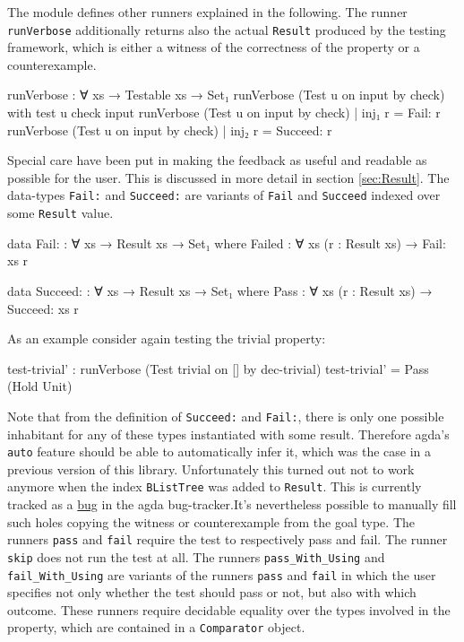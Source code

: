 \documentclass[10pt,a4paper]{article}
\begin{document}
The module defines other runners explained in the following.
The runner \texttt{runVerbose} additionally returns also the actual \texttt{Result} produced by the testing framework, which is either a witness of the correctness of the property or a counterexample.
\begin{code}
runVerbose : ∀ {xs} → Testable xs → Set₁
runVerbose (Test u on input by check) with test u check input
runVerbose (Test u on input by check) | inj₁ r = Fail: r
runVerbose (Test u on input by check) | inj₂ r = Succeed: r
\end{code}
Special care have been put in making the feedback as useful and readable as possible for the user. This is discussed in more detail in section 	\ref{sec:Result}.
The data-types \texttt{Fail:} and \texttt{Succeed:} are variants of \texttt{Fail} and \texttt{Succeed} indexed over some \texttt{Result} value.
\begin{code}
data Fail: : ∀ {xs} → Result xs → Set₁ where
  Failed : ∀ {xs} (r : Result xs) → Fail: {xs} r

data Succeed: : ∀ {xs} → Result xs → Set₁ where
  Pass : ∀ {xs} (r : Result xs) → Succeed: {xs} r
\end{code}
As an example consider again testing the trivial property:
\begin{code}
test-trivial' : runVerbose (Test trivial on [] by dec-trivial)
test-trivial' = Pass (Hold Unit)
\end{code}
Note that from the definition of \texttt{Succeed:} and \texttt{Fail:}, there is only one possible inhabitant for any of these types instantiated with some result. Therefore agda's \texttt{auto} feature should be able to automatically infer it, which was the case in a 	previous version of this library. 
Unfortunately this turned out not to work anymore when the index \texttt{BListTree} was added to \texttt{Result}. This is currently tracked as a \href{http://code.google.com/p/agda/issues/detail?id=1223}{bug} in the agda bug-tracker.It's nevertheless possible to manually fill such holes copying the witness or counterexample from the goal type.
The runners \texttt{pass} and \texttt{fail} require the test to respectively pass and fail. The runner \texttt{skip} does not run the test at all.
The runners \texttt{pass\_With\_Using} and \texttt{fail\_With\_Using} are variants of the runners \texttt{pass} and \texttt{fail} in which the user specifies not only whether the test should pass or not, but also with which outcome.
These runners require decidable equality over the types involved in the property, which are contained in a \texttt{Comparator} object.
\end{document}
